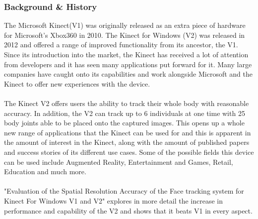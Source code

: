\documentclass[11pt]{article}
\begin{document}
\subsubsection{Background \& History}
The Microsoft Kinect(V1) was originally released as an extra piece of hardware
for Microsoft's Xbox360 in 2010. The Kinect for Windows (V2) was released
in 2012 and offered a range of improved functionality from its ancestor, the
V1. Since its introduction into the market, the Kinect has received a lot of
attention from developers and it has seen many applications put forward for 
it. Many large companies have caught onto its capabilities and work 
alongside Microsoft and the Kinect to offer new experiences with the device.\\ 
\\
The Kinect V2 offers users the ability to track their
whole body with reasonable accuracy. In addition, the V2 can track up to 6 individuals
at one time with 25 body joints able to be placed onto the captured images.
This opens up a whole new range of applications
that the Kinect can be used for and this is apparent in the amount of interest in the
Kinect, along with the amount of published papers and success stories of 
its different use cases.
Some of the possible fields this device can be used include 
Augmented Reality, Entertainment and Games, Retail, Education and much more.\\
\\ 
"Evaluation of the Spatial Resolution Accuracy of the Face 
tracking system for Kinect For Windows V1 and V2" \cite{AmonFuhrmann14}
explores in more detail the increase in performance and capability
of the V2 and shows that it beats V1 in every aspect. 
\end{document}
